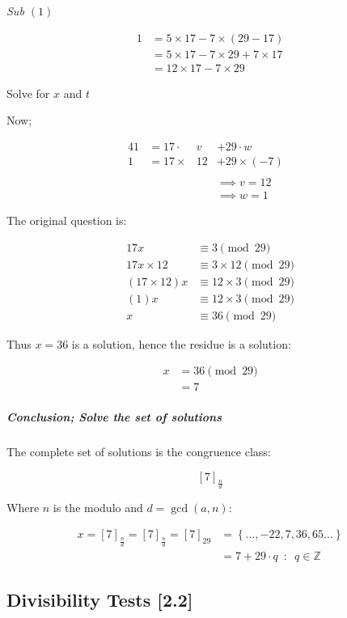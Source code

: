 \documentclass[
]{article}
\begin{document}
\emph{Sub \((1)\)}

\begin{align}
1 &= 5 \times 17 - 7 \times (29-17) \\
  &= 5 \times 17 - 7 \times 29 + 7 \times 17 \\
  &= 12 \times 17 - 7 \times 29
\end{align}

Solve for \(x\) and \(t\)

Now;

\begin{alignat}{4}
1 &= 17 \cdot &v      &+ 29 \cdot w& \\
1 &= 17 \times &12 &+ 29 \times (-7)& \\
\ \\
&&&\implies v = 12\\
&&&\implies w = 1
\end{alignat}

The original question is:

\begin{align}
17x &\equiv 3 \pmod{29} \\
17x \times 12 &\equiv 3 \times 12 \pmod{29} \\
(17\times 12) x &\equiv 12 \times 3 \pmod{29} \\
(1)x &\equiv 12 \times 3 \pmod{29} \\
x &\equiv 36 \pmod{29}
\end{align}

Thus \(x = 36\) is a solution, hence the residue is a solution:

\begin{align}
x &= 36 \pmod{29} \\
  &= 7
\end{align}

\hypertarget{header-n647}{%
\subparagraph{Conclusion; Solve the set of
solutions}\label{header-n647}}

The complete set of solutions is the congruence class:

\[[7]_{\frac{n}{d}}\]

Where \(n\) is the modulo and \(d = \gcd(a, n)\):

\begin{align}
x = [7]_{\frac{n}{d}} = [7]_{\frac{n}{d}}=[7]_{29} &= \left \{ \dots, -22, 7, 36, 65 \dots \right \}\\
&= 7 + 29 \cdot q \enspace : \enspace q \in \mathbb{Z}
\end{align}

\hypertarget{header-n653}{%
\subsection{Divisibility Tests {[}2.2{]}}\label{header-n653}}
\end{document}

